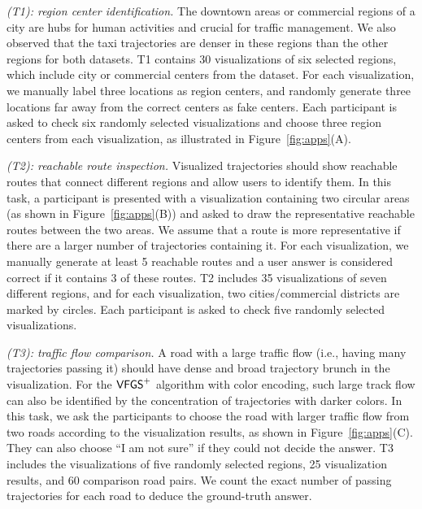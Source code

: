 \textit{(T1): region center identification.} The downtown areas or commercial regions of a city are hubs for human activities and crucial for traffic management. We also observed that the taxi trajectories are denser in these regions than the other regions for both datasets. T1 contains 30 visualizations of six selected regions, which include city or commercial centers from the \pt{} dataset. For each visualization, we manually label three locations as region centers, and randomly generate three locations far away from the correct centers as fake centers. Each participant is asked to check six randomly selected visualizations and choose three region centers from each visualization, as illustrated in Figure~\ref{fig:apps}(A).



\textit{(T2): reachable route inspection.} Visualized trajectories should show reachable routes that connect different regions and allow users to identify them. In this task, a participant is presented with a visualization containing two circular areas (as shown in Figure~\ref{fig:apps}(B)) and asked to draw the representative reachable routes between the two areas. We assume that a route is more representative if there are a larger number of trajectories containing it. For each visualization, we manually generate at least 5 reachable routes and a user answer is considered correct if it contains 3 of these routes. T2 includes 35 visualizations of seven different regions, and for each visualization, two cities/commercial districts are marked by circles. Each participant is asked to check five randomly selected visualizations.


\textit{(T3): traffic flow comparison.} A road with a large traffic flow (i.e., having many trajectories passing it) should have dense and broad trajectory brunch in the visualization. For the $\mathsf{VFGS}^{+}$ algorithm with color encoding, such large track flow can also be identified by the concentration of trajectories with darker colors. In this task, we ask the participants to choose the road with larger traffic flow from two roads according to the visualization results, as shown in Figure~\ref{fig:apps}(C). They can also choose ``I am not sure'' if they could not decide the answer. T3 includes the visualizations of five randomly selected regions, 25 visualization results, and 60 comparison road pairs. We count the exact number of passing trajectories for each road to deduce the ground-truth answer.




